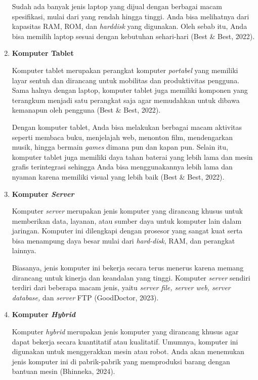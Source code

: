 \documentclass[12pt]{article}
\begin{document}
\begin{enumerate}
    \hspace{0.61cm}Sudah ada banyak jenis laptop yang dijual dengan berbagai macam spesifikasi, mulai dari yang rendah hingga tinggi. Anda bisa melihatnya dari kapasitas RAM, ROM, dan \textit{harddisk} yang digunakan. Oleh sebab itu, Anda bisa memilih laptop sesuai dengan kebutuhan sehari-hari (Best & Best, 2022).

    \item \textbf{Komputer Tablet} 

    \hspace{0.61cm}Komputer tablet merupakan perangkat komputer\textit{ portabel} yang memiliki layar sentuh dan dirancang untuk mobilitas dan produktivitas pengguna. Sama halnya dengan laptop, komputer tablet juga memiliki komponen yang terangkum menjadi satu perangkat saja agar memudahkan untuk dibawa kemanapun oleh pengguna (Best & Best, 2022). 

    \hspace{0.61cm}Dengan komputer tablet, Anda bisa melakukan berbagai macam aktivitas seperti membaca buku, menjelajah web, menonton film, mendengarkan musik, hingga bermain \textit{games} dimana pun dan kapan pun. Selain itu, komputer tablet juga memiliki daya tahan baterai yang lebih lama dan mesin grafis terintegrasi sehingga Anda bisa menggunakannya lebih lama dan nyaman karena memiliki visual yang lebih baik (Best & Best, 2022). 

    \item \textbf{Komputer \textit{Server}} 

    \hspace{0.61cm}Komputer \textit{server} merupakan jenis komputer yang dirancang khusus untuk memberikan data, layanan, atau sumber daya untuk komputer lain dalam jaringan. Komputer ini dilengkapi dengan prosesor yang sangat kuat serta bisa menampung daya besar mulai dari \textit{hard-disk}, RAM, dan perangkat lainnya. 

    \hspace{0.61cm}Biasanya, jenis komputer ini bekerja secara terus menerus karena memang dirancang untuk kinerja dan keandalan yang tinggi. Komputer \textit{server} sendiri terdiri dari beberapa macam jenis, yaitu \textit{server file, server web, server database,} dan \textit{server} FTP (GoodDoctor, 2023). 

    \item \textbf{Komputer \textit{Hybrid} }
    
    \hspace{0.61cm}Komputer \textit{hybrid} merupakan jenis komputer yang dirancang khusus agar dapat bekerja secara kuantitatif atau kualitatif. Umumnya, komputer ini digunakan untuk menggerakkan mesin atau robot. Anda akan menemukan jenis komputer ini di pabrik-pabrik yang memproduksi barang dengan bantuan mesin (Bhinneka, 2024).


\end{enumerate}
\end{document}
